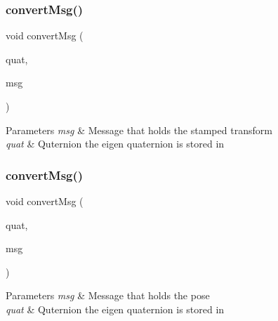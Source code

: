 \subsubsection{\texorpdfstring{convert\+Msg()}{convertMsg()}\hspace{0.1cm}{\footnotesize\ttfamily [3/14]}}
{\footnotesize\ttfamily void convert\+Msg (\begin{DoxyParamCaption}\item[{Eigen\+::\+Quaterniond \&}]{quat,  }\item[{geometry\+\_\+msgs\+::\+Transform\+Stamped \&}]{msg }\end{DoxyParamCaption})\hspace{0.3cm}{\ttfamily [inline]}}


\begin{DoxyParams}{Parameters}
{\em msg} & Message that holds the stamped transform \\
\hline
{\em quat} & Quternion the eigen quaternion is stored in \\
\hline
\end{DoxyParams}
\mbox{\label{group__MultiRobotController_gadc07db93efb76fd809b67b74dd13b939}} 
\subsubsection{\texorpdfstring{convert\+Msg()}{convertMsg()}\hspace{0.1cm}{\footnotesize\ttfamily [4/14]}}
{\footnotesize\ttfamily void convert\+Msg (\begin{DoxyParamCaption}\item[{Eigen\+::\+Quaterniond \&}]{quat,  }\item[{geometry\+\_\+msgs\+::\+Pose \&}]{msg }\end{DoxyParamCaption})\hspace{0.3cm}{\ttfamily [inline]}}


\begin{DoxyParams}{Parameters}
{\em msg} & Message that holds the pose \\
\hline
{\em quat} & Quternion the eigen quaternion is stored in \\
\hline
\end{DoxyParams}
\mbox{\label{group__MultiRobotController_ga8257db2bb94ec53eadfe87d04b38cc0b}} 
